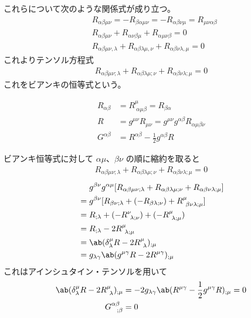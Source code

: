 \documentclass[uplatex,dvipdfmx,a4paper,11pt]{jlreq}
\theoremstyle{definition}
\begin{document}
これらについて次のような関係式が成り立つ。
\begin{align}
   & R_{\alpha\beta\mu\nu} = -R_{\beta\alpha\mu\nu} = -R_{\alpha\beta\nu\mu} = R_{\mu\nu\alpha\beta}   \\
   & R_{\alpha\beta\mu\nu} + R_{\alpha\nu\beta\mu} + R_{\alpha\mu\nu\beta} = 0                         \\
   & R_{\alpha\beta\mu\nu,\lambda} + R_{\alpha\beta\lambda\mu,\nu} + R_{\alpha\beta\nu\lambda,\mu} = 0
\end{align}
これよりテンソル方程式
\begin{align}
  R_{\alpha\beta\mu\nu;\lambda} + R_{\alpha\beta\lambda\mu;\nu} + R_{\alpha\beta\nu\lambda;\mu} = 0
\end{align}
これをビアンキの恒等式という。
\begin{definition}
  \begin{align}
    R_{\alpha\beta} & = R^\mu_{\ \alpha\mu\beta} = R_{\beta\alpha}                            \\
    R               & = g^{\mu\nu}R_{\mu\nu} = g^{\mu\nu}g^{\alpha\beta}R_{\alpha\mu\beta\nu} \\
    G^{\alpha\beta} & = R^{\alpha\beta} - \frac{1}{2}g^{\alpha\beta}R
  \end{align}
\end{definition}
ビアンキ恒等式に対して $\alpha\mu$、$\beta\nu$ の順に縮約を取ると
\begin{align}
  R_{\alpha\beta\mu\nu;\lambda} + R_{\alpha\beta\lambda\mu;\nu} + R_{\alpha\beta\nu\lambda;\mu} = 0
\end{align}
\begin{align}
   & \quad\ g^{\beta\nu}g^{\alpha\mu}[R_{\alpha\beta\mu\nu;\lambda} + R_{\alpha\beta\lambda\mu;\nu} + R_{\alpha\beta\nu\lambda;\mu}] \\
   & = g^{\beta\nu}[R_{\beta\nu;\lambda} + (- R_{\beta\lambda;\nu}) + R^\mu_{\ \beta\nu\lambda;\mu}]                                 \\
   & = R_{;\lambda} + (- R^\nu_{\ \lambda;\nu}) + (-R^\mu_{\ \lambda;\mu})                                                           \\
   & = R_{;\lambda} - 2R^\mu_{\ \lambda;\mu}                                                                                         \\
   & = \ab(\delta^\mu_\lambda R - 2R^\mu_{\ \lambda})_{;\mu}                                                                         \\
   & = g_{\lambda\gamma}\ab(g^{\mu\gamma}R - 2R^{\mu\gamma})_{;\mu}
\end{align}
これはアインシュタイン・テンソルを用いて
\begin{align}
  \ab(\delta^\mu_\lambda R - 2R^\mu_{\ \lambda})_{;\mu} & = -2g_{\lambda\gamma}\ab(R^{\mu\gamma} - \frac{1}{2}g^{\mu\gamma}R)_{;\mu} = 0 \\
  G^{\alpha\beta}_{\ \ ;\beta}                          & = 0
\end{align}
\end{document}
